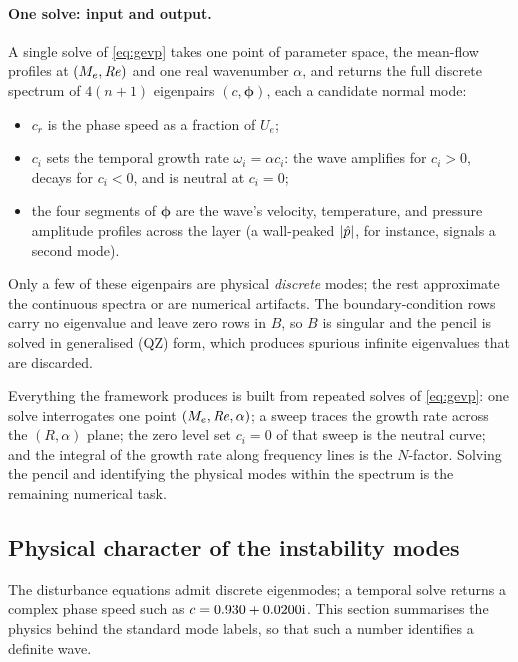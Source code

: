 \documentclass[11pt]{article}
\begin{document}
\paragraph{One solve: input and output.} A single solve of \eqref{eq:gevp} takes one point of
parameter space, the mean-flow profiles at $(M_e,\mathit{Re})$ and one real wavenumber $\alpha$, and
returns the full discrete spectrum of $4(n{+}1)$ eigenpairs $(c,\boldsymbol\phi)$, each a candidate
normal mode:
\begin{itemize}[nosep,leftmargin=1.6em]
  \item $c_r$ is the phase speed as a fraction of $U_e$;
  \item $c_i$ sets the temporal growth rate $\omega_i=\alpha c_i$: the wave amplifies for $c_i>0$,
        decays for $c_i<0$, and is neutral at $c_i=0$;
  \item the four segments of $\boldsymbol\phi$ are the wave's velocity, temperature, and pressure
        amplitude profiles across the layer (a wall-peaked $|\hat{p}|$, for instance, signals a second
        mode).
\end{itemize}
Only a few of these eigenpairs are physical \emph{discrete} modes; the rest approximate the continuous
spectra or are numerical artifacts. The boundary-condition rows carry no eigenvalue and leave zero
rows in $B$, so $B$ is singular and the pencil is solved in generalised (QZ) form, which produces
spurious infinite eigenvalues that are discarded.

Everything the framework produces is built from repeated solves of \eqref{eq:gevp}: one solve
interrogates one point $(M_e,\mathit{Re},\alpha)$; a sweep traces the growth rate across the $(R,\alpha)$
plane; the zero level set $c_i=0$ of that sweep is the neutral curve; and the integral of the growth
rate along frequency lines is the $N$-factor. Solving the pencil and identifying the physical modes
within the spectrum is the remaining numerical task.

\subsection{Physical character of the instability modes}\label{sec:mechanisms}
The disturbance equations admit discrete eigenmodes; a temporal solve returns a complex phase speed
such as $c=0.930+0.0200\mathrm{i}$. This section summarises the physics behind the standard mode labels, so
that such a number identifies a definite wave.
\end{document}
